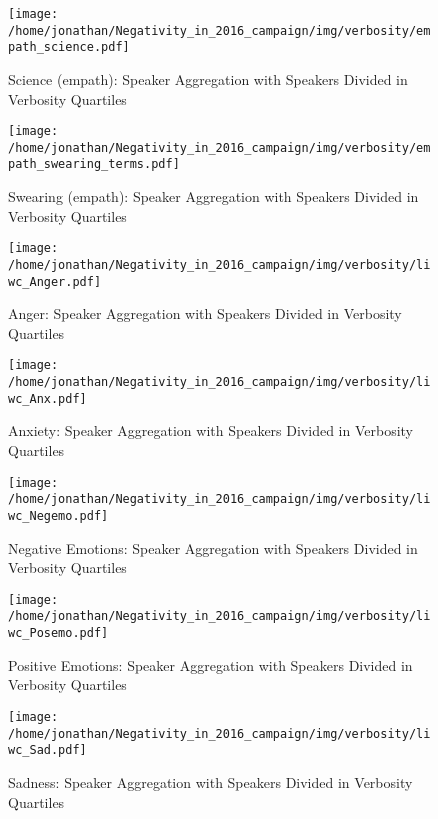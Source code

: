 \begin{figure}[h]\centering
	\texttt{[image: /home/jonathan/Negativity\_in\_2016\_campaign/img/verbosity/empath\_science.pdf]}
	\caption{Science (empath): Speaker Aggregation with Speakers Divided in Verbosity Quartiles}
	\label{fig: verbosity_Science (empath)}
\end{figure}

\begin{figure}[h]\centering
	\texttt{[image: /home/jonathan/Negativity\_in\_2016\_campaign/img/verbosity/empath\_swearing\_terms.pdf]}
	\caption{Swearing (empath): Speaker Aggregation with Speakers Divided in Verbosity Quartiles}
	\label{fig: verbosity_Swearing (empath)}
\end{figure}

\begin{figure}[h]\centering
	\texttt{[image: /home/jonathan/Negativity\_in\_2016\_campaign/img/verbosity/liwc\_Anger.pdf]}
	\caption{Anger: Speaker Aggregation with Speakers Divided in Verbosity Quartiles}
	\label{fig: verbosity_Anger}
\end{figure}

\begin{figure}[h]\centering
	\texttt{[image: /home/jonathan/Negativity\_in\_2016\_campaign/img/verbosity/liwc\_Anx.pdf]}
	\caption{Anxiety: Speaker Aggregation with Speakers Divided in Verbosity Quartiles}
	\label{fig: verbosity_Anxiety}
\end{figure}

\begin{figure}[h]\centering
	\texttt{[image: /home/jonathan/Negativity\_in\_2016\_campaign/img/verbosity/liwc\_Negemo.pdf]}
	\caption{Negative Emotions: Speaker Aggregation with Speakers Divided in Verbosity Quartiles}
	\label{fig: verbosity_Negative Emotions}
\end{figure}

\begin{figure}[h]\centering
	\texttt{[image: /home/jonathan/Negativity\_in\_2016\_campaign/img/verbosity/liwc\_Posemo.pdf]}
	\caption{Positive Emotions: Speaker Aggregation with Speakers Divided in Verbosity Quartiles}
	\label{fig: verbosity_Positive Emotions}
\end{figure}

\begin{figure}[h]\centering
	\texttt{[image: /home/jonathan/Negativity\_in\_2016\_campaign/img/verbosity/liwc\_Sad.pdf]}
	\caption{Sadness: Speaker Aggregation with Speakers Divided in Verbosity Quartiles}
	\label{fig: verbosity_Sadness}
\end{figure}

